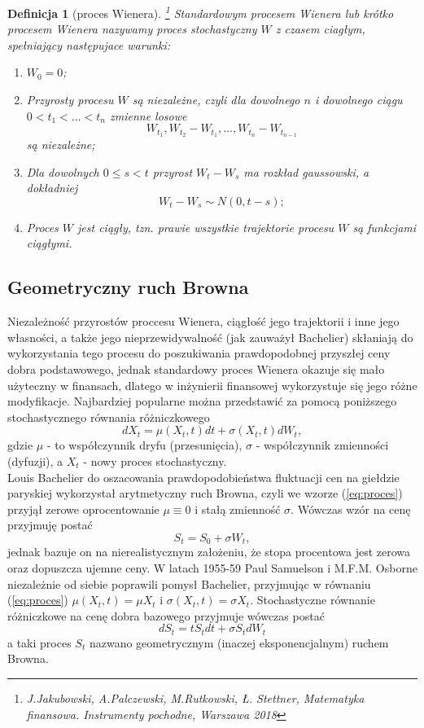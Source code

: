 \documentclass[12pt]{article}
\newtheorem{definition}[theorem]{Definicja}
\begin{document}
\begin{definition}[proces Wienera]\footnote{J.Jakubowski, A.Palczewski, M.Rutkowski, Ł. Stettner, \textit{Matematyka finansowa. Instrumenty pochodne}, Warszawa 2018}
Standardowym procesem Wienera lub krótko procesem Wienera nazywamy proces stochastyczny $W$ z czasem ciagłym, spełniający następujace warunki:
\begin{enumerate}
\item $W_0 = 0$;
\item Przyrosty procesu $W$ są niezależne, czyli dla dowolnego $n$ i dowolnego ciągu $0<t_1<\ldots<t_n$ zmienne losowe
$$ W_{t_1}, W_{t_2}-W_{t_1},\ldots, W_{t_n} - W_{t_{n-1}}$$
są niezależne;
\item Dla dowolnych $0\leq s < t$ przyrost $W_t-W_s$ ma rozkład gaussowski, a dokładniej
$$ W_t - W_s \sim N(0,t-s);$$
\item Proces $W$ jest ciągły, tzn. prawie wszystkie trajektorie procesu $W$ są funkcjami ciągłymi.
\end{enumerate}
\end{definition}

\subsection{Geometryczny ruch Browna}
Niezależność przyrostów proccesu Wienera, ciągłość jego trajektorii i inne jego własności, a także jego nieprzewidywalność (jak zauważył Bachelier) skłaniają do wykorzystania tego procesu do poszukiwania prawdopodobnej przyszłej ceny dobra podstawowego, jednak standardowy proces Wienera okazuje się mało użyteczny w finansach, dlatego w inżynierii finansowej wykorzystuje się jego różne modyfikacje. Najbardziej popularne można przedstawić za pomocą poniższego stochastycznego równania różniczkowego
\begin{equation}
\label{eq:proces}
dX_t = \mu(X_t,t)dt + \sigma(X_t,t)dW_t,
\end{equation}
gdzie $\mu$ - to współczynnik dryfu (przesunięcia), $\sigma$ - współczynnik zmienności (dyfuzji), a $X_t$ - nowy proces stochastyczny.\\

Louis Bachelier do oszacowania prawdopodobieństwa fluktuacji cen na giełdzie paryskiej wykorzystał arytmetyczny ruch Browna, czyli we wzorze (\ref{eq:proces}) przyjął zerowe oprocentowanie $\mu \equiv 0$ i stałą zmienność $\sigma$. Wówczas wzór na cenę przyjmuję postać $$ S_t = S_0 + \sigma W_t,$$ jednak bazuje on na nierealistycznym założeniu, że stopa procentowa jest zerowa oraz dopuszcza ujemne ceny. W latach 1955-59 Paul Samuelson i M.F.M. Osborne niezależnie od siebie poprawili pomysł Bachelier, przyjmując w równaniu (\ref{eq:proces}) $\mu(X_t,t)=\mu X_t$ i $\sigma(X_t,t)=\sigma X_t$. Stochastyczne równanie różniczkowe na cenę dobra bazowego przyjmuje wówczas postać
\begin{equation}
\label{eq:dSt}
dS_t = t S_t dt + \sigma S_t dW_t
\end{equation}
a taki proces $S_t$ nazwano geometrycznym (inaczej eksponencjalnym) ruchem Browna.
\end{document}
